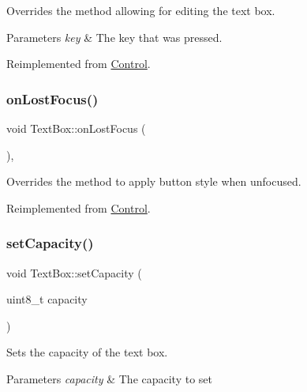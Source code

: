 Overrides the method allowing for editing the text box. 


\begin{DoxyParams}{Parameters}
{\em key} & The key that was pressed.\\
\hline
\end{DoxyParams}


Reimplemented from \mbox{\hyperlink{class_control_a4731a62a9ea0510d51924509ae74c93e}{Control}}.

\mbox{\label{class_text_box_aab9c57dae96c908b9b3a4f03b837a9fe}} 
\subsubsection{\texorpdfstring{onLostFocus()}{onLostFocus()}}
{\footnotesize\ttfamily void Text\+Box\+::on\+Lost\+Focus (\begin{DoxyParamCaption}{ }\end{DoxyParamCaption})\hspace{0.3cm}{\ttfamily [override]}, {\ttfamily [virtual]}}



Overrides the method to apply button style when unfocused. 



Reimplemented from \mbox{\hyperlink{class_control_abbc8ce4460f790b4a5cf3dcb102b3f46}{Control}}.

\mbox{\label{class_text_box_a929abf1c11ac0ae54b1c3b0c300450d7}} 
\subsubsection{\texorpdfstring{setCapacity()}{setCapacity()}}
{\footnotesize\ttfamily void Text\+Box\+::set\+Capacity (\begin{DoxyParamCaption}\item[{uint8\+\_\+t}]{capacity }\end{DoxyParamCaption})}



Sets the capacity of the text box. 


\begin{DoxyParams}{Parameters}
{\em capacity} & The capacity to set\\
\hline
\end{DoxyParams}
\mbox{\label{class_text_box_ac722a34fe2f513f5ea9596d4f34d67fd}} 
